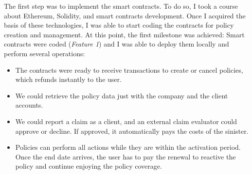  {The first step was to implement the smart contracts. To do so, I took a course about Ethereum, Solidity, and smart contracts development. Once I acquired the basis of these technologies, I was able to start coding the contracts for policy creation and management.
 At this point, the first milestone was achieved: Smart contracts were coded (\textit{Feature 1}) and I was able to deploy them locally and perform several operations:}
 \begin{itemize}
     \item The contracts were ready to receive transactions to create or cancel policies, which refunds instantly to the user.
      \item We could retrieve the policy data just with the company and the client accounts.
      \item We could report a claim as a client, and an external claim evaluator could approve or decline. If approved, it automatically pays the costs of the sinister.
      \item Policies can perform all actions while they are within the activation period. Once the end date arrives, the user has to pay the renewal to reactive the policy and continue enjoying the policy coverage.
 \end{itemize}
 
